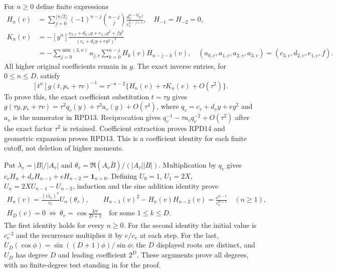 For $n\ge0$ define finite expressions
\[
 \begin{aligned}
 H_n(v)&=\sum_{j=0}^{\lfloor n/2\rfloor}(-1)^{n-j}\binom{n-j}{j}
      \frac{d_v^{n-2j}e^j}{c_v^{n-j+1}},\quad H_{-1}=H_{-2}=0,\\
 K_n(v)&=-[y^n]\frac{c_{3,v}+d_{2,v}y+e_{1,v}y^2+fy^3}
                            {(c_v+d_vy+ey^2)^2}\\
 &=-\sum_{j=0}^{\min(3,n)}a_{j,v}\sum_{k=0}^{n-j}H_k(v)H_{n-j-k}(v),\quad
 (a_{0,v},a_{1,v},a_{2,v},a_{3,v})=(c_{3,v},d_{2,v},e_{1,v},f).
 \end{aligned}\tag{RPD13}
\]
All higher original coefficients remain in $g$.  The exact inverse
entries, for $0\le n\le D$, satisfy
\[
 [t^n]g(t,p_*+\tau v)^{-1}
   =\tau^{-n-2}\{H_n(v)+\tau K_n(v)+O(\tau^2)\}.\tag{RPD14}
\]
To prove this, the exact coefficient substitution $t=\tau y$ gives
$g(\tau y,p_*+\tau v)=\tau^2q_v(y)+\tau^3a_v(y)+O(\tau^4)$,
where $q_v=c_v+d_vy+ey^2$ and $a_v$ is the numerator in RPD13.
Reciprocation gives $q_v^{-1}-\tau a_vq_v^{-2}+O(\tau^2)$ after
the exact factor $\tau^2$ is retained.  Coefficient extraction
proves RPD14 and geometric expansion proves RPD13.  This is a
coefficient identity for each finite cutoff, not deletion of higher
moments.

Put $\lambda_v=|B|/|A_v|$ and
$\theta_v=\Re(A_v\bar B)/(|A_v||B|)$.  Multiplication by $q_v$
gives $c_vH_n+d_vH_{n-1}+eH_{n-2}=\boldsymbol1_{n=0}$.
Defining $U_0=1$, $U_1=2X$, $U_n=2XU_{n-1}-U_{n-2}$, induction
and the sine addition identity prove
\[
 \begin{gathered}
 H_n(v)=\frac{(i\lambda_v)^n}{c_v}U_n(\theta_v),\qquad
 H_{n-1}(v)^2-H_n(v)H_{n-2}(v)=\frac{e^{n-1}}{c_v^{n+1}}
          \quad(n\ge1),\\
 H_D(v)=0\ \Longleftrightarrow\
 \theta_v=\cos\frac{k\pi}{D+1}\quad\text{for some }1\le k\le D.
 \end{gathered}
 \tag{RPD15}
\]
The first identity holds for every $n\ge0$.
For the second identity the initial value is $c_v^{-2}$ and the
recurrence multiplies it by $e/c_v$ at each step.  For the last,
$U_D(\cos\phi)=\sin((D+1)\phi)/\sin\phi$; the $D$ displayed
roots are distinct, and $U_D$ has degree $D$ and leading coefficient
$2^D$.  These arguments prove all degrees, with no finite-degree
test standing in for the proof.

